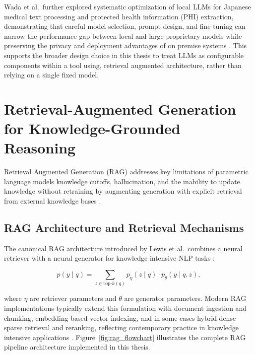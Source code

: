 \documentclass[12pt,a4paper]{report}
\begin{document}
	Wada et al.\ further explored systematic optimization of local LLMs for Japanese
	medical text processing and protected health information (PHI) extraction,
	demonstrating that careful model selection, prompt design, and fine tuning can
	narrow the performance gap between local and large proprietary models while
	preserving the privacy and deployment advantages of on premise systems
	\cite{Wada2026LocalLLMOptimization}. This supports the broader design choice in
	this thesis to treat LLMs as configurable components within a tool using,
	retrieval augmented architecture, rather than relying on a single fixed model.
	
	
	
	\section{Retrieval-Augmented Generation for Knowledge-Grounded Reasoning}
	\label{sec:rag}
	
	Retrieval Augmented Generation (RAG) addresses key limitations of parametric
	language models knowledge cutoffs, hallucination, and the inability to update
	knowledge without retraining by augmenting generation with explicit retrieval
	from external knowledge bases \cite{lewis2020retrieval}.
	
	\subsection{RAG Architecture and Retrieval Mechanisms}
	
	The canonical RAG architecture introduced by Lewis et al.\ combines a neural
	retriever with a neural generator for knowledge intensive \ac{NLP} tasks
	\cite{lewis2020retrieval}:
	
	\begin{equation}
		p(y \mid q)
		= \sum_{z \in \text{top-}k(q)} p_\eta(z \mid q) \cdot p_\theta(y \mid q, z),
	\end{equation}
	
	where $\eta$ are retriever parameters and $\theta$ are generator parameters.
	Modern RAG implementations typically extend this formulation with document
	ingestion and chunking, embedding based vector indexing, and in some cases
	hybrid dense sparse retrieval and reranking, reflecting contemporary practice in
	knowledge intensive applications \cite{lewis2020retrieval,firoozi2025rag_dentistry,xu2025mega_rag}. Figure~\ref{fig:rag_flowchart} illustrates the complete RAG pipeline architecture implemented in this thesis.
	
\end{document}

